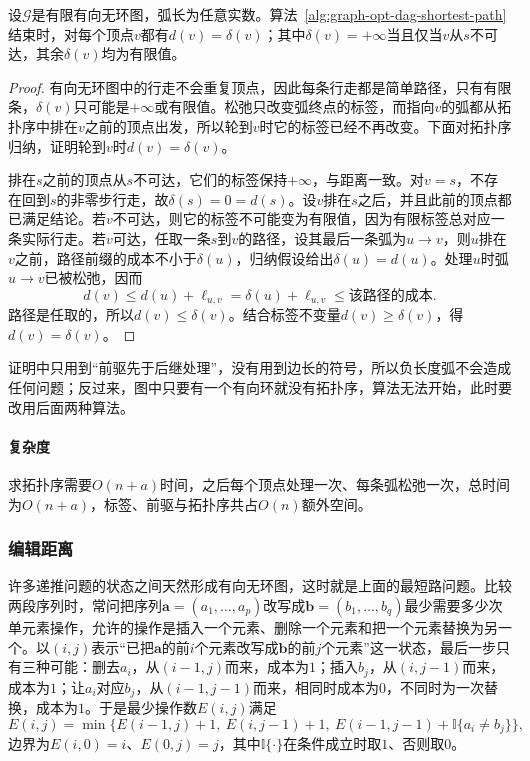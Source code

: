 \begin{theorem}[有向无环图上最短路的正确性]
\label{thm:graph-opt-dag-shortest-path}
设$\mathcal G$是有限有向无环图，弧长为任意实数。算法~\ref{alg:graph-opt-dag-shortest-path}结束时，对每个顶点$v$都有$d(v)=\delta(v)$；其中$\delta(v)=+\infty$当且仅当$v$从$s$不可达，其余$\delta(v)$均为有限值。
\end{theorem}

\begin{proof}
有向无环图中的行走不会重复顶点，因此每条行走都是简单路径，只有有限条，$\delta(v)$只可能是$+\infty$或有限值。松弛只改变弧终点的标签，而指向$v$的弧都从拓扑序中排在$v$之前的顶点出发，所以轮到$v$时它的标签已经不再改变。下面对拓扑序归纳，证明轮到$v$时$d(v)=\delta(v)$。

排在$s$之前的顶点从$s$不可达，它们的标签保持$+\infty$，与距离一致。对$v=s$，不存在回到$s$的非零步行走，故$\delta(s)=0=d(s)$。设$v$排在$s$之后，并且此前的顶点都已满足结论。若$v$不可达，则它的标签不可能变为有限值，因为有限标签总对应一条实际行走。若$v$可达，任取一条$s$到$v$的路径，设其最后一条弧为$u\to v$，则$u$排在$v$之前，路径前缀的成本不小于$\delta(u)$，归纳假设给出$\delta(u)=d(u)$。处理$u$时弧$u\to v$已被松弛，因而
\[
  d(v)\leq d(u)+\ell_{u,v}=\delta(u)+\ell_{u,v}\leq\text{该路径的成本}.
\]
路径是任取的，所以$d(v)\leq\delta(v)$。结合标签不变量$d(v)\geq\delta(v)$，得$d(v)=\delta(v)$。
\end{proof}

证明中只用到“前驱先于后继处理”，没有用到边长的符号，所以负长度弧不会造成任何问题；反过来，图中只要有一个有向环就没有拓扑序，算法无法开始，此时要改用后面两种算法。

\paragraph{复杂度}
求拓扑序需要$O(n+a)$时间，之后每个顶点处理一次、每条弧松弛一次，总时间为$O(n+a)$，标签、前驱与拓扑序共占$O(n)$额外空间。

\subsubsection{编辑距离}

许多递推问题的状态之间天然形成有向无环图，这时就是上面的最短路问题。比较两段序列时，常问把序列$\bm a=(a_1,\ldots,a_p)$改写成$\bm b=(b_1,\ldots,b_q)$最少需要多少次单元素操作，允许的操作是插入一个元素、删除一个元素和把一个元素替换为另一个。以$(i,j)$表示“已把$\bm a$的前$i$个元素改写成$\bm b$的前$j$个元素”这一状态，最后一步只有三种可能：删去$a_i$，从$(i-1,j)$而来，成本为$1$；插入$b_j$，从$(i,j-1)$而来，成本为$1$；让$a_i$对应$b_j$，从$(i-1,j-1)$而来，相同时成本为$0$，不同时为一次替换，成本为$1$。于是最少操作数$E(i,j)$满足
\begin{equation}
  E(i,j)=\min\bigl\{E(i-1,j)+1,\ E(i,j-1)+1,\ E(i-1,j-1)+\mathbb I\{a_i\neq b_j\}\bigr\},
  \label{eq:graph-opt-edit-distance}
\end{equation}
边界为$E(i,0)=i$、$E(0,j)=j$，其中$\mathbb I\{\cdot\}$在条件成立时取$1$、否则取$0$。

